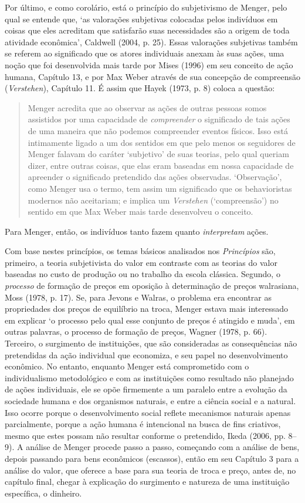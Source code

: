 \documentclass[12pt]{article}
\begin{document}
Por último, e como corolário, está o princípio do subjetivismo de Menger, pelo qual se entende que, ‘as valorações subjetivas colocadas pelos indivíduos em coisas que eles acreditam que satisfarão suas necessidades são a origem de toda atividade econômica’, Caldwell (2004, p. 25). Essas valorações subjetivas também se referem ao significado que os atores individuais anexam às suas ações, uma noção que foi desenvolvida mais tarde por Mises (1996) em seu conceito de ação humana, Capítulo 13, e por Max Weber através de sua concepção de compreensão (\textit{Verstehen}), Capítulo 11. É assim que Hayek (1973, p. 8) coloca a questão:

\begin{quote}
Menger acredita que ao observar as ações de outras pessoas somos assistidos por uma capacidade de \textit{compreender} o significado de tais ações de uma maneira que não podemos compreender eventos físicos. Isso está intimamente ligado a um dos sentidos em que pelo menos os seguidores de Menger falavam do caráter ‘subjetivo’ de suas teorias, pelo qual queriam dizer, entre outras coisas, que elas eram baseadas em nossa capacidade de apreender o significado pretendido das ações observadas. ‘Observação’, como Menger usa o termo, tem assim um significado que os behavioristas modernos não aceitariam; e implica um \textit{Verstehen} (‘compreensão’) no sentido em que Max Weber mais tarde desenvolveu o conceito.
\end{quote}

Para Menger, então, os indivíduos tanto fazem quanto \textit{interpretam} ações.

Com base nestes princípios, os temas básicos analisados nos \textit{Princípios} são, primeiro, a teoria subjetivista do valor em contraste com as teorias do valor baseadas no custo de produção ou no trabalho da escola clássica. Segundo, o \textit{processo} de formação de preços em oposição à determinação de preços walrasiana, Moss (1978, p. 17). Se, para Jevons e Walras, o problema era encontrar as propriedades dos preços de equilíbrio na troca, Menger estava mais interessado em explicar ‘o processo pelo qual esse conjunto de preços é atingido e muda’, em outras palavras, o processo de formação de preços, Wagner (1978, p. 66). Terceiro, o surgimento de instituições, que são consideradas as consequências não pretendidas da ação individual que economiza, e seu papel no desenvolvimento econômico. No entanto, enquanto Menger está comprometido com o individualismo metodológico e com as instituições como resultado não planejado de ações individuais, ele se opõe firmemente a um paralelo entre a evolução da sociedade humana e dos organismos naturais, e entre a ciência social e a natural. Isso ocorre porque o desenvolvimento social reflete mecanismos naturais apenas parcialmente, porque a ação humana é intencional na busca de fins criativos, mesmo que estes possam não resultar conforme o pretendido, Ikeda (2006, pp. 8–9). A análise de Menger procede passo a passo, começando com a análise de bens, depois passando para bens econômicos (escassos), então em seu Capítulo 3 para a análise do valor, que oferece a base para sua teoria de troca e preço, antes de, no capítulo final, chegar à explicação do surgimento e natureza de uma instituição específica, o dinheiro.
\end{document}
